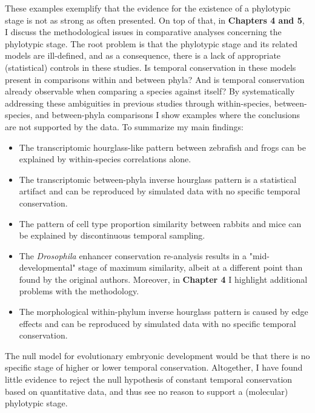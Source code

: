 These examples exemplify that the evidence for the existence of a phylotypic stage is not as strong as often presented. On top of that, in \textbf{Chapters 4 and 5}, I discuss the methodological issues in comparative analyses concerning the phylotypic stage. The root problem is that the phylotypic stage and its related models are ill-defined, and as a consequence, there is a lack of appropriate (statistical) controls in these studies. Is temporal conservation in these models present in comparisons within and between phyla? And is temporal conservation already observable when comparing a species against itself? By systematically addressing these ambiguities in previous studies through within-species, between-species, and between-phyla comparisons I show examples where the conclusions are not supported by the data. To summarize my main findings:
\begin{itemize}
    \item The transcriptomic hourglass-like pattern between zebrafish and frogs\cite{marletaz2018} can be explained by within-species correlations alone.
    \item The transcriptomic between-phyla inverse hourglass pattern\cite{Levin2016} is a statistical artifact and can be reproduced by simulated data with no specific temporal conservation.
    \item The pattern of cell type proportion similarity between rabbits and mice\cite{Mayshar2023} can be explained by discontinuous temporal sampling.
    \item The \textit{Drosophila} enhancer conservation re-analysis results in a "mid-developmental" stage of maximum similarity, albeit at a different point than found by the original authors. Moreover, in \textbf{Chapter 4} I highlight additional problems with the methodology.
    \item  The morphological within-phylum inverse hourglass pattern is caused by edge effects and can be reproduced by simulated data with no specific temporal conservation.
\end{itemize}
\noindent
The null model for evolutionary embryonic development would be that there is no specific stage of higher or lower temporal conservation. Altogether, I have found little evidence to reject the null hypothesis of constant temporal conservation based on quantitative data, and thus see no reason to support a (molecular) phylotypic stage.

